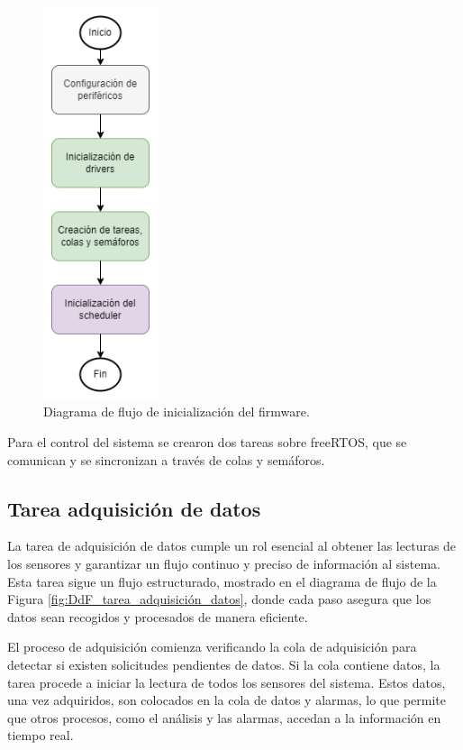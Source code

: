 \vspace{1cm}
\begin{figure}[htbp]
	\centering
	\includegraphics[width=0.3\textwidth, height=0.5\textheight]{./Figures/DdF_firmware.png}
	\caption{Diagrama de flujo de inicialización del firmware.}
	\label{fig:DdF_firmware}
\end{figure}
\vspace{1cm}

Para el control del sistema se crearon dos tareas sobre freeRTOS, que se comunican
y se sincronizan a través de colas y semáforos.

\subsection{Tarea adquisición de datos}

La tarea de adquisición de datos cumple un rol esencial al obtener las lecturas de los sensores y garantizar un flujo continuo y preciso de información al sistema. Esta tarea sigue un flujo estructurado, mostrado en el diagrama de flujo de la Figura \ref{fig:DdF_tarea_adquisición_datos}, donde cada paso asegura que los datos sean recogidos y procesados de manera eficiente.

El proceso de adquisición comienza verificando la cola de adquisición para detectar si existen solicitudes pendientes de datos. Si la cola contiene datos, la tarea procede a iniciar la lectura de todos los sensores del sistema. Estos datos, una vez adquiridos, son colocados en la cola de datos y alarmas, lo que permite que otros procesos, como el análisis y las alarmas, accedan a la información en tiempo real.

